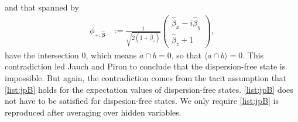 \documentclass[12pt]{article}
\begin{document}
and that spanned by 
\begin{align*}
    \phi_{+,\hat{\bm{\beta}}}
    &:= \frac{1}{\sqrt{2 (1 + \hat{\beta}_z)}}
  \begin{pmatrix}
    \hat{\beta}_x - i \hat{\beta}_y \\
    \hat{\beta}_z + 1
  \end{pmatrix},
\end{align*}
have the intersection $0$, which means $a \cap b = 0$, so that $\langle a \cap b \rangle = 0$. This contradiction led Jauch and Piron to conclude that the dispersion-free state is impossible. But again, the contradiction comes from the tacit assumption that \ref{list:jpB} holds for the expectation values of dispersion-free states. \ref{list:jpB} does not have to be satisfied for dispesion-free states. We only require \ref{list:jpB} is reproduced after averaging over hidden variables.



\end{document}
